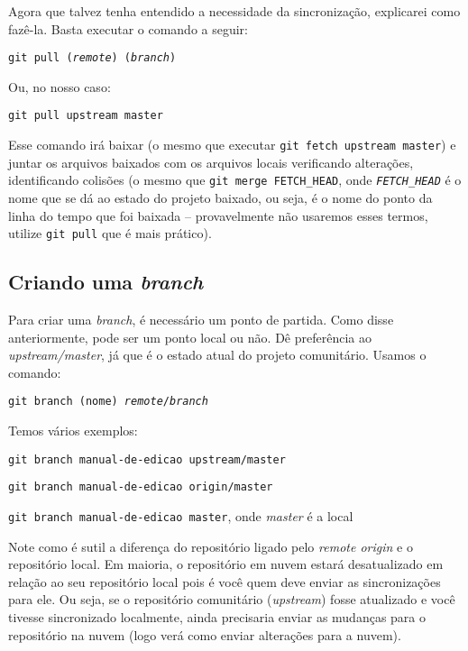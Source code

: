 \documentclass[a4paper,oneside,10pt]{memoir}
\begin{document}
Agora que talvez tenha entendido a necessidade da sincronização, explicarei
como fazê-la. Basta executar o comando a seguir:

\begin{center}
\texttt{git pull (\emph{remote}) (\emph{branch})}
\end{center}

Ou, no nosso caso:

\begin{center}
\texttt{git pull upstream master}
\end{center}

Esse comando irá baixar (o mesmo que executar \texttt{git fetch upstream
mas\-ter}) e juntar os arquivos baixados com os arquivos locais verificando
alterações, identificando colisões (o mesmo que \texttt{git merge FETCH\_HEAD},
onde \emph{\texttt{FETCH\_\-HEAD}} é o nome que se dá ao estado do projeto
baixado, ou seja, é o nome do ponto da linha do tempo que foi baixada --
provavelmente não usaremos esses termos, utilize \texttt{git pull} que é mais
prático).

\subsection{Criando uma \emph{branch}}

Para criar uma \emph{branch}, é necessário um ponto de partida. Como disse
anteriormente, pode ser um ponto local ou não. Dê preferência ao
\emph{upstream/master}, já que é o estado atual do projeto comunitário. Usamos
o comando:

\begin{center}
\texttt{git branch (nome) \emph{remote}/\emph{branch}}
\end{center}

Temos vários exemplos:

\begin{center}
\texttt{git branch manual-de-edicao upstream/master}

\texttt{git branch manual-de-edicao origin/master}

\texttt{git branch manual-de-edicao master}, onde \emph{master} é a local
\end{center}

Note como é sutil a diferença do repositório ligado pelo \emph{remote origin} e
o repositório local. Em maioria, o repositório em nuvem estará desatualizado em
relação ao seu repositório local pois é você quem deve enviar as sincronizações
para ele. Ou seja, se o repositório comunitário (\emph{upstream}) fosse
atualizado e você tivesse sincronizado localmente, ainda precisaria enviar as
mudanças para o repositório na nuvem (logo verá como enviar alterações para
a nuvem).
\end{document}

